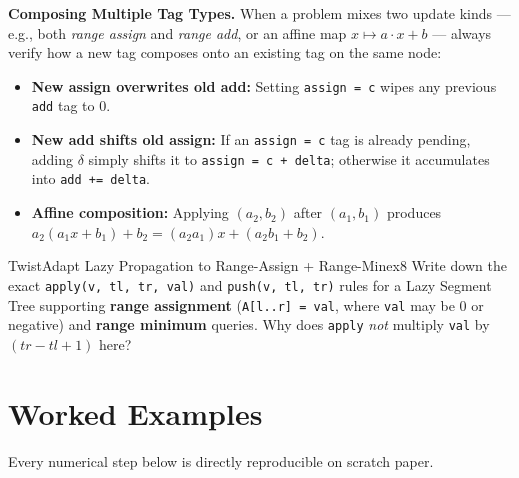 \documentclass[11pt,a4paper]{article}
\theoremstyle{definition}
\begin{document}
\textbf{Composing Multiple Tag Types.} When a problem mixes two update kinds --- e.g., both \emph{range assign} and \emph{range add}, or an affine map $x \mapsto a \cdot x + b$ --- always verify how a new tag composes onto an existing tag on the same node:
\begin{itemize}[itemsep=2pt, topsep=2pt]
    \item \textbf{New assign overwrites old add:} Setting \texttt{assign = c} wipes any previous \texttt{add} tag to $0$.
    \item \textbf{New add shifts old assign:} If an \texttt{assign = c} tag is already pending, adding $\delta$ simply shifts it to \texttt{assign = c + delta}; otherwise it accumulates into \texttt{add += delta}.
    \item \textbf{Affine composition:} Applying $(a_2, b_2)$ after $(a_1, b_1)$ produces $a_2(a_1 x + b_1) + b_2 = (a_2 a_1)x + (a_2 b_1 + b_2)$.
\end{itemize}

\begin{tryitbox}{Twist}{Adapt Lazy Propagation to Range-Assign + Range-Min}{ex8}
Write down the exact \texttt{apply(v, tl, tr, val)} and \texttt{push(v, tl, tr)} rules for a Lazy Segment Tree supporting \textbf{range assignment} (\texttt{A[l..r] = val}, where \texttt{val} may be $0$ or negative) and \textbf{range minimum} queries. Why does \texttt{apply} \emph{not} multiply \texttt{val} by $(tr - tl + 1)$ here?
\end{tryitbox}

\section{Worked Examples}

Every numerical step below is directly reproducible on scratch paper.
\end{document}
